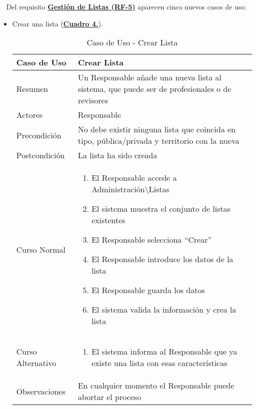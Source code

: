 \newpage~
Del requisito \textbf{\hyperref[tab:rfGestLst]{Gestión de Listas (RF-5)}} aparecen cinco nuevos casos de uso:
\begin{itemize}
	\item \addtocounter{tabla}{1} Crear una lista (\textbf{\hyperref[tab:curCrearLista]{Cuadro 4.}}).
		\begin{table}[!htbp]
		  \centering  \addtocounter{casouso}{1}
		  \begin{tabular}{|l | p{100mm}|}
		    \textbf{Caso de Uso}  & \textbf{Crear Lista} \\ \hline
		    Resumen 		 & Un Responsable añade una nueva lista al sistema, que puede ser de profesionales o de revisores \\ \hline
		    Actores  		 & Responsable \\ \hline
		    Precondición  	 & No debe existir ninguna lista que coincida en tipo, pública/privada y territorio con la nueva  \\ \hline
		    Postcondición  	 & La lista ha sido creada \\ \hline
		    Curso Normal   	 & \begin{enumerate}
			  \item El Responsable accede a Administración\textbackslash Listas
			  \item El sistema muestra el conjunto de listas existentes
			  \item El Responsable selecciona ``Crear''
			  \item El Responsable introduce los datos de la lista
			  \item El Responsable guarda los datos
			  \item El sistema valida la información y crea la lista
		    \end{enumerate}  \\ \hline
		    Curso Alternativo  & \begin{enumerate}
			  \item El sistema informa al Responsable que ya existe una lista con esas características
		    \end{enumerate}  \\ \hline
		    Observaciones 	 & En cualquier momento el Responsable puede abortar el proceso  \\ \hline
		  \end{tabular}
		  \caption{Caso de Uso  - Crear Lista}
		  \label{tab:curCrearLista}
		\end{table}
		\FloatBarrier
	

\end{itemize}
